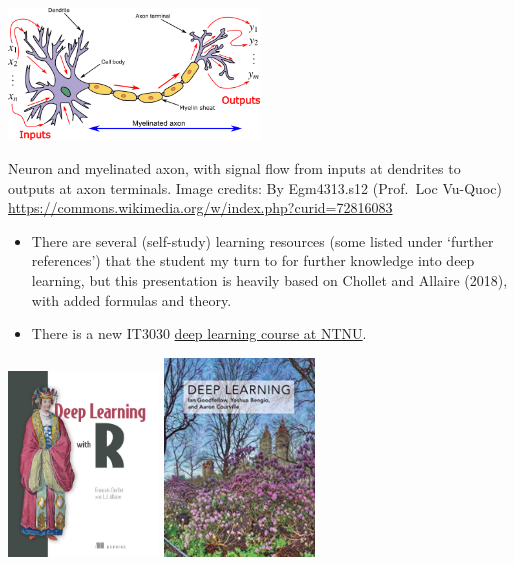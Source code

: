 \documentclass[10pt,ignorenonframetext,]{beamer}
\providecommand{\tightlist}{%
  \setlength{\itemsep}{0pt}\setlength{\parskip}{0pt}}
\begin{document}
\begin{frame}

\centering

\includegraphics[width=0.5\textwidth,height=\textheight]{Neuron3.png}

Neuron and myelinated axon, with signal flow from inputs at dendrites to
outputs at axon terminals. Image credits: By Egm4313.s12 (Prof.~Loc
Vu-Quoc) \url{https://commons.wikimedia.org/w/index.php?curid=72816083}

\end{frame}

\begin{frame}

\begin{itemize}
\tightlist
\item
  There are several (self-study) learning resources (some listed under
  `further references') that the student my turn to for further
  knowledge into deep learning, but this presentation is heavily based
  on Chollet and Allaire (2018), with added formulas and theory.
\item
  There is a new IT3030
  \href{https://www.ntnu.no/studier/emner/IT3030\#tab=omEmnet}{deep
  learning course at NTNU}.
\end{itemize}

\centering

\includegraphics[width=0.3\textwidth,height=\textheight]{DeepLearningwithR.jpeg}
\includegraphics[width=0.3\textwidth,height=\textheight]{DeepLearning.jpeg}

\end{frame}
\end{document}
